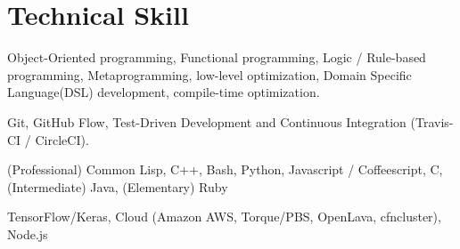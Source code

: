 \documentclass[letterpaper,11pt]{article}
\begin{document}
\begin{CV}

\end{CV}

\renewcommand{\refname}{Selected Publications}

{
\let\uline\relax
\nocite{Asai2019a}
\nocite{Asai2019b}
\nocite{Asai2019c}
\nocite{Asai2018}
\nocite{Asai2017e}
\nocite{Asai2017b}
\nocite{Asai2017}
\nocite{Asai2016}
\nocite{Asai2015}
\nocite{Asai2014}




}

\section{Technical Skill}

\begin{CV}
 \item[Programming Paradigm:] %
 Object-Oriented programming,
 Functional programming,
 Logic / Rule-based programming,
 Metaprogramming, low-level optimization,
 Domain Specific Language(DSL) development, compile-time optimization.
 \item[Development:] Git, GitHub Flow, Test-Driven Development and Continuous Integration (Travis-CI / CircleCI).
 \item[Languages:]
 (Professional) Common Lisp, C++, Bash, Python, Javascript / Coffeescript, C,
 (Intermediate) Java,
 (Elementary)   Ruby
 \item[Frameworks:] TensorFlow/Keras, Cloud (Amazon AWS, Torque/PBS, OpenLava, cfncluster),
 Node.js%
\end{CV}
\end{document}
